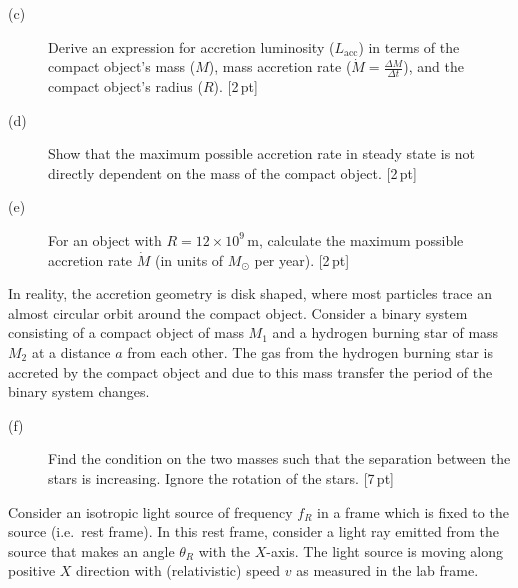 \begin{description}
\item[(c)] Derive an expression for accretion luminosity ($L_{\mathrm{acc}}$)
  in terms of the compact object's mass ($M$), mass accretion rate
  ($\dot{M} = \frac{\Delta M}{\Delta t}$), and the compact object's radius
  ($R$). \hfill[2\,pt]
\item[(d)] Show that the maximum possible accretion rate in steady state is
  not directly dependent on the mass of the compact object. \hfill[2\,pt]
\item[(e)] For an object with $R = 12 \times 10^9$\,m, calculate the maximum
  possible accretion rate $\dot{M}$ (in units of $M_\odot$ per year).
  \hfill[2\,pt]
\end{description}

In reality, the accretion geometry is disk shaped, where most particles trace
an almost circular orbit around the compact object. Consider a binary system
consisting of a compact object of mass $M_1$ and a hydrogen burning star of
mass $M_2$ at a distance $a$ from each other. The gas from the hydrogen
burning star is accreted by the compact object and due to this mass transfer
the period of the binary system changes.

\begin{description}
\item[(f)] Find the condition on the two masses such that the separation
  between the stars is increasing. Ignore the rotation of the stars.
  \hfill[7\,pt]
\end{description}

Consider an isotropic light source of frequency $f_R$ in a frame which is
fixed to the source (i.e.\ rest frame). In this rest frame, consider a light
ray emitted from the source that makes an angle $\theta_R$ with the $X$-axis.
The light source is moving along positive $X$ direction with (relativistic)
speed $v$ as measured in the lab frame.

